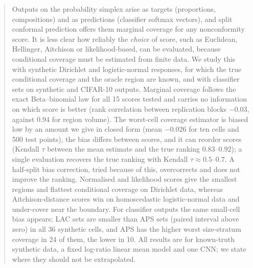 \begin{abstract}
Outputs on the probability simplex arise as targets (proportions, compositions) and as predictions (classifier softmax vectors), and split conformal prediction offers them marginal coverage for any nonconformity score.
It is less clear how reliably the \emph{choice} of score, such as Euclidean, Hellinger, Aitchison or likelihood-based, can be evaluated, because conditional coverage must be estimated from finite data.
We study this with synthetic Dirichlet and logistic-normal responses, for which the true conditional coverage and the oracle region are known, and with classifier sets on synthetic and CIFAR-10 outputs.
Marginal coverage follows the exact Beta--binomial law for all 15 scores tested and carries no information on which score is better (rank correlation between replication blocks $-0.03$, against $0.94$ for region volume).
The worst-cell coverage estimator is biased low by an amount we give in closed form (mean $-0.026$ for ten cells and 500 test points), the bias differs between scores, and it can reorder scores (Kendall $\tau$ between the mean estimate and the true ranking $0.83$--$0.92$); a single evaluation recovers the true ranking with Kendall $\tau\approx0.5$--$0.7$.
A half-split bias correction, tried because of this, overcorrects and does not improve the ranking.
Normalised and likelihood scores give the smallest regions and flattest conditional coverage on Dirichlet data, whereas Aitchison-distance scores win on homoscedastic logistic-normal data and under-cover near the boundary.
For classifier outputs the same small-cell bias appears; LAC sets are smaller than APS sets (paired interval above zero) in all 36 synthetic cells, and APS has the higher worst size-stratum coverage in 24 of them, the lower in 10.
All results are for known-truth synthetic data, a fixed log-ratio linear mean model and one CNN; we state where they should not be extrapolated.
\end{abstract}
